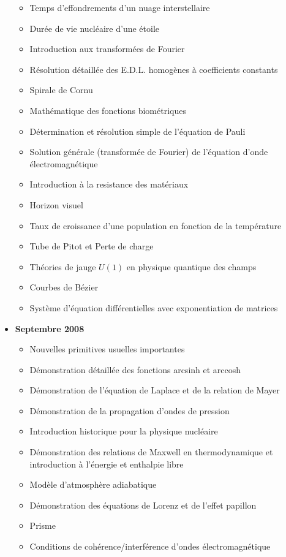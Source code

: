 \documentclass[12pt,a4paper,twoside,openright]{report}
\theoremstyle{definition}
\theoremstyle{itexmp}
\numberwithin{equation}{section}
\begin{document}
\begin{itemize}
\begin{itemize}[noitemsep]
				\item Temps d'effondrements d'un nuage interstellaire
				\item Durée de vie nucléaire d'une étoile
				\item Introduction aux transformées de Fourier
				\item Résolution détaillée des E.D.L. homogènes à coefficients constants
				\item Spirale de Cornu
				\item Mathématique des fonctions biométriques
				\item Détermination et résolution simple de l'équation de Pauli
				\item Solution générale (transformée de Fourier) de l'équation d'onde électromagnétique
				\item Introduction à la resistance des matériaux
				\item Horizon visuel
				\item Taux de croissance d'une population en fonction de la température
				\item Tube de Pitot et Perte de charge
				\item Théories de jauge $U(1)$ en physique quantique des champs
				\item Courbes de Bézier
				\item Système d'équation différentielles avec exponentiation de matrices
			\end{itemize}
		\item \textbf{Septembre 2008}
			\begin{itemize}[noitemsep]
				\item Nouvelles primitives usuelles importantes
				\item Démonstration détaillée des fonctions arcsinh et arccosh
				\item Démonstration de l'équation de Laplace et de la relation de Mayer
				\item Démonstration de la propagation d'ondes de pression
				\item Introduction historique pour la physique nucléaire
				\item Démonstration des relations de Maxwell en thermodynamique et introduction à l'énergie et enthalpie libre
				\item Modèle d'atmosphère adiabatique
				\item Démonstration des équations de Lorenz et de l'effet papillon
				\item Prisme
				\item Conditions de cohérence/interférence d'ondes électromagnétique

\end{itemize}
\end{itemize}
\end{document}
